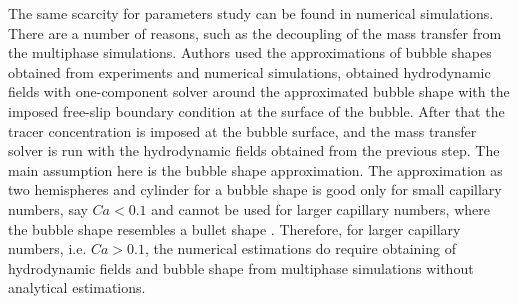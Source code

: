 \documentclass{article}
\begin{document}
The same scarcity for parameters study can be found in numerical simulations. There are a number of reasons, such as 
the decoupling of the mass transfer from the multiphase simulations. Authors \cite{kreutzer-overview,vanbaten-circular} used
the approximations of bubble shapes obtained from experiments and numerical simulations, obtained hydrodynamic fields with 
one-component solver around the approximated bubble shape with the imposed free-slip boundary condition at the surface of the bubble.
After that the tracer concentration is imposed at the bubble surface, and the mass transfer solver is run with the hydrodynamic fields obtained
from the previous step. The main assumption here is the bubble shape approximation. The approximation as two hemispheres and cylinder
\cite{vanbaten-circular} for a bubble shape is good only for small capillary numbers, say $Ca<0.1$ and cannot be used for larger capillary numbers, 
where the bubble shape resembles a bullet shape \cite{kuzmin-binary2d,kuzmin-binary3d}. Therefore, for larger capillary numbers, i.e. $Ca>0.1$, 
the numerical estimations do require obtaining of hydrodynamic fields and bubble shape from multiphase simulations without analytical estimations.
\end{document}
